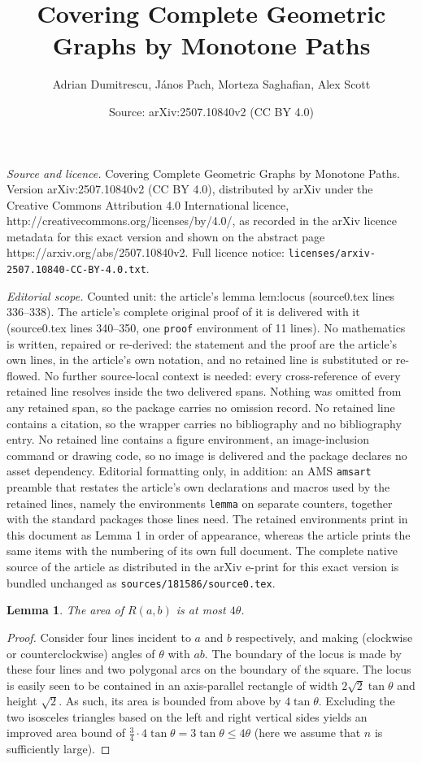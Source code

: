 \documentclass[10pt,a4paper]{amsart}
\title{Covering Complete Geometric Graphs by Monotone Paths}
\author{Adrian Dumitrescu, J\'anos Pach, Morteza Saghafian, Alex Scott}
\date{Source: arXiv:2507.10840v2 (CC BY 4.0)}
\newtheorem{lemma}{Lemma}
\begin{document}
\maketitle

\noindent\emph{Source and licence.} Covering Complete Geometric Graphs by Monotone Paths. Version arXiv:2507.10840v2 (CC BY 4.0), distributed by arXiv under the Creative Commons Attribution 4.0 International licence, http://creativecommons.org/licenses/by/4.0/, as recorded in the arXiv licence metadata for this exact version and shown on the abstract page https://arxiv.org/abs/2507.10840v2. Full licence notice: \texttt{licenses/arxiv-2507.10840-CC-BY-4.0.txt}.\par\smallskip

\noindent\textit{Editorial scope.} Counted unit: the article's lemma lem:locus (source0.tex lines 336--338). The article's complete original proof of it is delivered with it (source0.tex lines 340--350, one \texttt{proof} environment of 11 lines). No mathematics is written, repaired or re-derived: the statement and the proof are the article's own lines, in the article's own notation, and no retained line is substituted or re-flowed.  No further source-local context is needed: every cross-reference of every retained line resolves inside the two delivered spans.  Nothing was omitted from any retained span, so the package carries no omission record.  No retained line contains a citation, so the wrapper carries no bibliography and no bibliography entry.  No retained line contains a figure environment, an image-inclusion command or drawing code, so no image is delivered and the package declares no asset dependency.  Editorial formatting only, in addition: an AMS \texttt{amsart} preamble that restates the article's own declarations and macros used by the retained lines, namely the environments \texttt{lemma} on separate counters, together with the standard packages those lines need.  The retained environments print in this document as Lemma 1 in order of appearance, whereas the article prints the same items with the numbering of its own full document.  The complete native source of the article as distributed in the arXiv e-print for this exact version is bundled unchanged as \texttt{sources/181586/source0.tex}.
\begin{lemma}  \label{lem:locus}
The area of $R(a,b)$ is at most $4 \theta$. 
\end{lemma}

\begin{proof}
  Consider four lines incident to $a$ and $b$ respectively, and making 
(clockwise or counterclockwise) angles of $\theta$ with $ab$.
  The boundary of the locus is made by these four lines and two polygonal arcs
  on the boundary of the square. The locus is easily seen to be contained in an axis-parallel rectangle
  of width $2 \sqrt{2} \tan \theta$ and height $\sqrt2$.
  As such, its area is bounded from above by $ 4 \tan \theta$.
  Excluding the two isosceles triangles based on the left and right vertical sides yields an improved
  area bound of $\frac34 \cdot 4 \tan \theta = 3 \tan \theta \leq 4 \theta$
  (here we assume that $n$ is sufficiently large). 
\end{proof}
\end{document}
